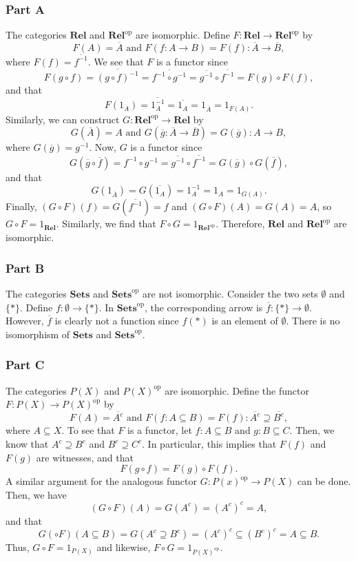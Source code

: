\documentclass[reqno]{amsart}
\providecommand{\Sets}{\mathbf{Sets}}
\providecommand{\Rel}{\mathbf{Rel}}
\providecommand{\op}[1]{{#1^{\mathrm{op}}}}
\begin{document}
\subsubsection*{Part A} The categories $\Rel$ and $\Rel^{\mathrm{op}}$ are isomorphic. Define $F: \Rel \to \op{\Rel}$ by
\[F(A) = \overline{A} \textrm{ and } F(f: A \to B) = F(f): \overline{A} \to \overline{B},\]
where $F(f) = \overline{f^{-1}}$. We see that $F$ is a functor since
\[F(g\circ f) = \overline{(g \circ f)^{-1}} = \overline{ f^{-1} \circ g^{-1}} = \overline{g^{-1}} \circ \overline{f^{-1}} = F(g) \circ F(f),\]
and that
\[F(1_A) = \overline{1_A^{-1}} = \overline{1_A} = 1_{\overline{A}} = 1_{F(A)}.\]
Similarly, we can construct $G: \op{\Rel} \to \Rel$ by
\[G(\overline{A}) = A \textrm{ and } G(\overline{g}:\overline{A} \to \overline{B}) = G(\overline{g}): A \to B,\]
where $G(\overline{g}) = g^{-1}$. Now, $G$ is a functor since
\[G(\overline{g} \circ \overline{f}) = f^{-1} \circ g^{-1} = \overline{g^{-1}} \circ \overline{f^{-1}} = G(\overline{g}) \circ G(\overline{f}),\]
and that
\[G(1_{\overline{A}}) = G(\overline{1_A}) = 1_A^{-1} = 1_A = 1_{G(A)}.\]
Finally, $(G \circ F) (f) = G(\overline{f^{-1}}) = f$ and $(G \circ F)(A) = G(A) = A$, so $G \circ F = 1_{\Rel}$. Similarly, we find that $F \circ G = 1_\op{\Rel}$. Therefore, $\Rel$ and $\op\Rel$ are isomorphic.

\subsubsection*{Part B} The categories $\Sets$ and $\op\Sets$ are not isomorphic. Consider the two sets $\emptyset$ and $\{*\}$. Define $f: \emptyset \to \{*\}$. In $\op\Sets$, the corresponding arrow is $\overline{f} : \{*\} \to \emptyset$. However, $\overline{f}$ is clearly not a function since $f(*)$ is an element of $\emptyset$. There is no isomorphism of $\Sets$ and $\op\Sets$.

\subsubsection*{Part C} The categories $P(X)$ and $\op{P(X)}$ are isomorphic. Define the functor $F: P(X) \to \op{P(X)}$ by
\[F(A) = \overline{A^c}\textrm{ and } F(f: A \subseteq B) = F(f): \overline{A^c} \supseteq\overline{B^c},\]
where $A \subseteq X$. To see that $F$ is a functor, let $f: A \subseteq B$ and $g: B \subseteq C$. Then, we know that $A^c \supseteq B^c$ and $B^c \supseteq C^c$. In particular, this implies that $F(f)$ and $F(g)$ are witnesses, and that
\[F(g\circ f) = F(g) \circ F(f).\]
A similar argument for the analogous functor $G: \op{P(x)} \to P(X)$ can be done. Then, we have
\[(G \circ F)(A) = G(A^c) = (A^c)^c = A,\]
and that
\[G(\circ F)(A \subseteq B) = G( A^c \supseteq B^c) = (A^c)^c \subseteq (B^c)^c = A \subseteq B.\]
Thus, $G \circ F = 1_{P(X)}$ and likewise, $F\circ G = 1_{\op{P(X)}}$.\\
\end{document}
